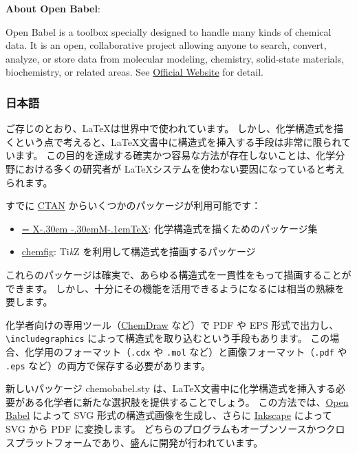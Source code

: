 \documentclass[12pt]{jsarticle}
\def\XyM{\ifnum\fam=-1\relax\fam=0\relax\fi\TestCount=\fam%
X\kern-.30em\smash{\raise.50ex\hbox{$\fam\TestCount\Upsilon$}}%
\kern-.30em{M}}
\def\XyMTeX{\XyM\kern-.1em\TeX}
\begin{document}
\noindent \textbf{About Open Babel}:

Open Babel is a toolbox specially designed to handle many kinds of chemical data.
It is an open, collaborative project allowing anyone to search, convert, analyze, or store data from molecular modeling, chemistry, solid-state materials, biochemistry, or related areas.
See \href{http://openbabel.org/}{Official Website} for detail.

\clearpage

\subsubsection{日本語}

ご存じのとおり、\LaTeX は世界中で使われています。
しかし、化学構造式を描くという点で考えると、\LaTeX 文書中に構造式を挿入する手段は非常に限られています。
この目的を達成する確実かつ容易な方法が存在しないことは、化学分野における多くの研究者が \LaTeX システムを使わない要因になっていると考えられます。

すでに \href{http://www.ctan.org/}{CTAN} からいくつかのパッケージが利用可能です：
\begin{itemize}
\item \href{http://www.ctan.org/pkg/xymtex}{\XyMTeX}: 化学構造式を描くためのパッケージ集
\item \href{http://www.ctan.org/pkg/chemfig}{\textsf{chemfig}}: Ti\textit{k}Z を利用して構造式を描画するパッケージ
\end{itemize}
これらのパッケージは確実で、あらゆる構造式を一貫性をもって描画することができます。
しかし、十分にその機能を活用できるようになるには相当の熟練を要します。

化学者向けの専用ツール（\href{http://www.cambridgesoft.com/Ensemble_for_Chemistry/ChemDraw/}{ChemDraw} など）で PDF や EPS 形式で出力し、\verb|\includegraphics| によって構造式を取り込むという手段もあります。
この場合、化学用のフォーマット（\verb|.cdx| や \verb|.mol| など）と画像フォーマット（\verb|.pdf| や \verb|.eps| など）の両方で保存する必要があります。

新しいパッケージ \textsf{chemobabel.sty} は、\LaTeX 文書中に化学構造式を挿入する必要がある化学者に新たな選択肢を提供することでしょう。
この方法では、\href{http://openbabel.org/}{Open Babel} によって SVG 形式の構造式画像を生成し、さらに \href{https://inkscape.org/ja/}{Inkscape} によって SVG から PDF に変換します。
どちらのプログラムもオープンソースかつクロスプラットフォームであり、盛んに開発が行われています。 \\
\end{document}
